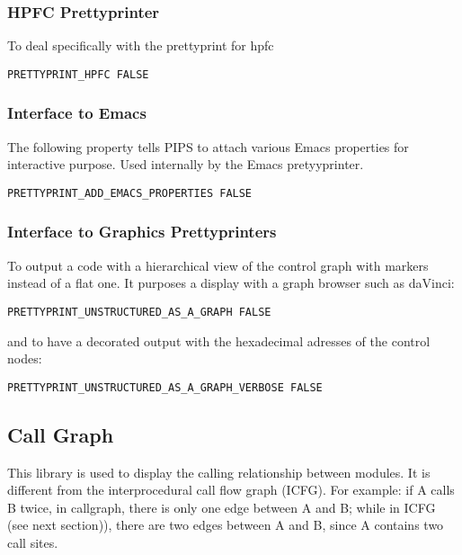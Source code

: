 \subsubsection{HPFC Prettyprinter}

To deal specifically with the prettyprint for hpfc

\begin{verbatim}
PRETTYPRINT_HPFC FALSE
\end{verbatim}


\subsubsection{Interface to Emacs}

The following property tells PIPS to attach various Emacs properties
for interactive purpose. Used internally by the Emacs pretyyprinter.
\begin{verbatim}
PRETTYPRINT_ADD_EMACS_PROPERTIES FALSE
\end{verbatim}


\subsubsection{Interface to Graphics Prettyprinters}

To output a code with a hierarchical view of the control graph with
markers instead of a flat one. It purposes a display with a graph
browser such as daVinci:

\begin{verbatim}
PRETTYPRINT_UNSTRUCTURED_AS_A_GRAPH FALSE
\end{verbatim}

and to have a decorated output with the hexadecimal adresses of the
control nodes:
\begin{verbatim}
PRETTYPRINT_UNSTRUCTURED_AS_A_GRAPH_VERBOSE FALSE
\end{verbatim}

\subsection{Call Graph}

This library is used to display the calling relationship between
modules.  It is different from the interprocedural call flow graph
(ICFG). For  example: if A calls B twice, in
callgraph, there is only one edge between A and B; while in ICFG (see
next section)), there are two edges between A and B, since A contains
two call sites.  

